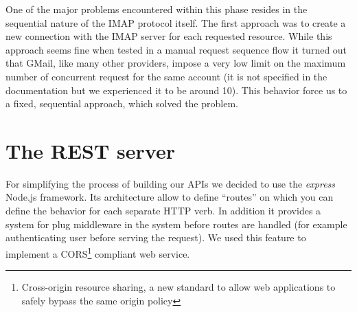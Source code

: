 \documentclass[a4paper,12pt]{report}
\begin{document}
One of the major problems encountered within this phase resides in the sequential nature of the IMAP protocol itself. The first approach was to create a new connection with the IMAP server for each requested resource. While this approach seems fine when tested in a manual request sequence flow it turned out that GMail, like many other providers, impose a very low limit on the maximum number of concurrent request for the same account (it is not specified in the documentation but we experienced it to be around 10). This behavior force us to a fixed, sequential approach, which solved the problem.

\section{The REST server}
For simplifying the process of building our APIs we decided to use the \emph{express} Node.js framework.
Its architecture allow to define ``routes'' on which you can define the behavior for each separate HTTP verb. In addition it provides a system for plug middleware in the system before routes are handled (for example authenticating user before serving the request). We used this feature to implement a CORS\footnote{Cross-origin resource sharing, a new standard to allow web applications to safely bypass the same origin policy} compliant web service.
\end{document}
